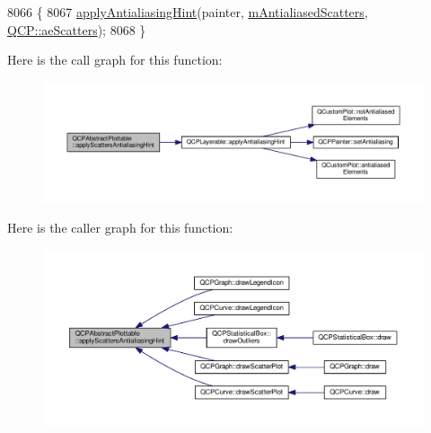 \begin{DoxyCode}
8066                                \{
8067   \hyperlink{class_q_c_p_layerable_a62bd552d1a45aa9accb24b310542279e}{applyAntialiasingHint}(painter, \hyperlink{class_q_c_p_abstract_plottable_aa115755e525a8e3a86dc683f9cab755b}{mAntialiasedScatters}, 
      \hyperlink{namespace_q_c_p_ae55dbe315d41fe80f29ba88100843a0cae45ed8cd167bffe27d7f40da4bc17e9c}{QCP::aeScatters});
8068 \}
\end{DoxyCode}


Here is the call graph for this function\+:\nopagebreak
\begin{figure}[H]
\begin{center}
\leavevmode
\includegraphics[width=350pt]{class_q_c_p_abstract_plottable_a753272ee225a62827e90c3e1e78de4b1_cgraph}
\end{center}
\end{figure}




Here is the caller graph for this function\+:\nopagebreak
\begin{figure}[H]
\begin{center}
\leavevmode
\includegraphics[width=350pt]{class_q_c_p_abstract_plottable_a753272ee225a62827e90c3e1e78de4b1_icgraph}
\end{center}
\end{figure}


\hypertarget{class_q_c_p_abstract_plottable_aa74cdceb9c7286ef116fbfa58e0326e7}{}
